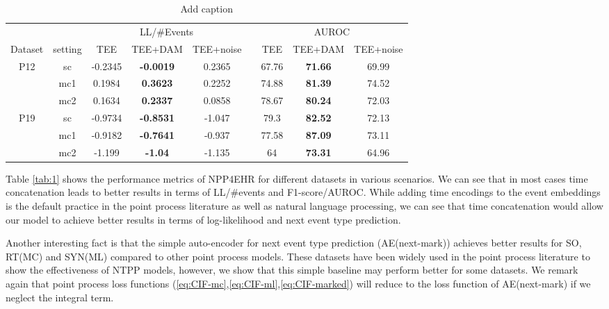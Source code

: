 \documentclass[journal,twoside,web]{ieeecolor}
\begin{document}
  
\begin{table}[htbp]
    \centering
    \caption{Add caption}
      \begin{tabular}{ccccccccc}
      \toprule
      \toprule
            &       & \multicolumn{3}{c}{LL/\#Events} &       & \multicolumn{3}{c}{AUROC} \\
  \cmidrule{3-5}\cmidrule{7-9}    Dataset & setting & TEE   & TEE+DAM & TEE+noise &       & TEE   & TEE+DAM & TEE+noise \\
      \midrule
      \multirow{3}[2]{*}{P12} & sc    & -0.2345 & \textbf{-0.0019} & 0.2365 &       & 67.76 & \textbf{71.66} & 69.99 \\
            & mc1   & 0.1984 & \textbf{0.3623} & 0.2252 &       & 74.88 & \textbf{81.39} & 74.52 \\
            & mc2   & 0.1634 & \textbf{0.2337} & 0.0858 &       & 78.67 & \textbf{80.24} & 72.03 \\
      \midrule
      \multirow{3}[2]{*}{P19} & sc    & -0.9734 & \textbf{-0.8531} & -1.047 &       & 79.3  & \textbf{82.52} & 72.13 \\
            & mc1   & -0.9182 & \textbf{-0.7641} & -0.937 &       & 77.58 & \textbf{87.09} & 73.11 \\
            & mc2   & -1.199 & \textbf{-1.04} & -1.135 &       & 64    & \textbf{73.31} & 64.96 \\
      \bottomrule
      \bottomrule
      \end{tabular}%
    \label{tab:2}%
  \end{table}%

Table \ref{tab:1} shows the performance metrics of NPP4EHR for different datasets in various scenarios. We can see that in most cases time concatenation leads to better results in terms of LL/\#events and F1-score/AUROC. While adding time encodings to the event embeddings is the default practice in the point process literature \cite*{zhangSelfAttentiveHawkesProcess2020,zuoTransformerHawkesProcess2020a} as well as natural language processing, we can see that time concatenation would allow our model to achieve better results in terms of log-likelihood and next event type prediction.

Another interesting fact is that the simple auto-encoder for next event type prediction (AE(next-mark)) achieves better results for SO, RT(MC) and SYN(ML) compared to other point process models. These datasets have been widely used in the point process literature to show the effectiveness of NTPP models, however, we show that this simple baseline may perform better for some datasets. We remark again that point process loss functions (\ref*{eq:CIF-mc},\ref*{eq:CIF-ml},\ref*{eq:CIF-marked}) will reduce to the loss function of AE(next-mark) if we neglect the integral term.
\end{document}
